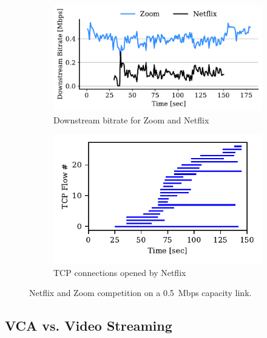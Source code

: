\begin{figure}[t!]
\centering
\begin{subfigure}[t]{.35\textwidth}
    \centering
    \includegraphics[width=1\textwidth]{figures/comp_ts/zoom_netflix_0.5_dl_r1.pdf}
    \caption{Downstream bitrate for Zoom and Netflix}
    \label{subfig:comp_zoom_netflix_bitrate}
\end{subfigure}\hfill
\begin{subfigure}[t]{.35\textwidth}
    \centering
    \includegraphics[width=1\textwidth]{figures/comp/netflix_connection_0_5.pdf}
    \caption{TCP connections opened by Netflix}
    \label{subfig:comp_netflix_conn}
\end{subfigure}
\caption{Netflix and Zoom competition on a 0.5~Mbps capacity link.}
\label{fig:comp_netflix_zoom}
\end{figure}

\subsection{VCA vs. Video Streaming}

